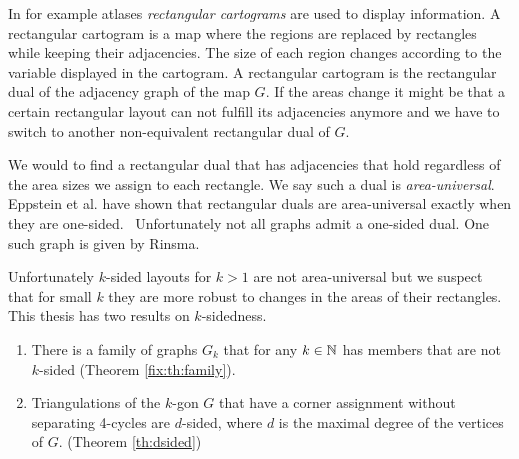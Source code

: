   In for example atlases \emph{rectangular cartograms} are used to display information. A rectangular cartogram is a map where the regions are replaced by rectangles while keeping their adjacencies. The size of each region changes according to the variable displayed in the cartogram.  A rectangular cartogram is the rectangular dual of the adjacency graph of the map $G$.
  If the areas change it might be that a certain rectangular layout can not fulfill its adjacencies anymore and we have to switch to another non-equivalent rectangular dual of $G$.

  We would to find a rectangular dual that has adjacencies that hold regardless of the area sizes we assign to each rectangle. We say such a dual is \emph{area-universal}.
  Eppstein et al. have shown that rectangular duals are area-universal exactly when they are one-sided.~\cite{Eppstein2012} Unfortunately not all graphs admit a one-sided dual. One such graph is given by Rinsma.~\cite{Rinsma1987} 

  Unfortunately $k$-sided layouts for $k>1$ are not area-universal but we suspect that for small $k$ they are more robust to changes in the areas of their rectangles. This thesis has two results on $k$-sidedness.
  \begin{enumerate}
    \item There is a family of graphs $G_k$ that for any $k \in \mathbb{N}$ has members that are not $k$-sided (Theorem \ref{fix:th:family}).
    \item Triangulations of the $k$-gon $G$ that have a corner assignment without separating 4-cycles are $d$-sided, where $d$ is the maximal degree of the vertices of $G$. (Theorem \ref{th:dsided})
  \end{enumerate}

